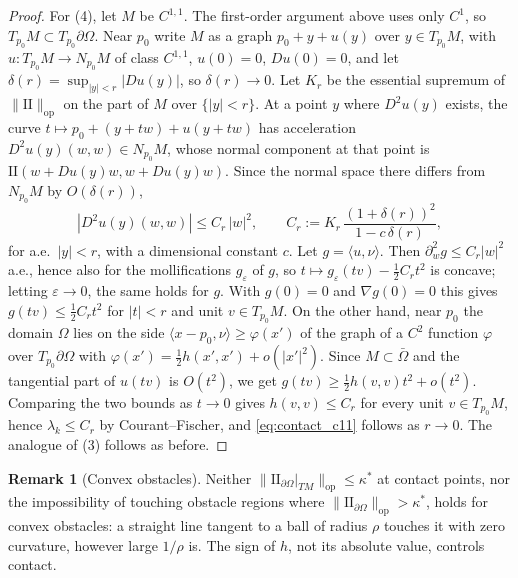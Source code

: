 \documentclass[11pt,reqno]{amsart}
\theoremstyle{definition}
\newtheorem{remark}[theorem]{Remark}
\providecommand{\II}{\mathrm{I\!I}}
\newcommand{\op}{\mathrm{op}}
\numberwithin{equation}{section}
\providecommand{\II}{\mathrm{II}}
\begin{document}
\begin{proof}
For (4), let $M$ be $C^{1,1}$. The first-order argument above uses only $C^1$, so $T_{p_0}M \subset T_{p_0}\partial\Omega$. Near $p_0$ write $M$ as a graph $p_0 + y + u(y)$ over $y \in T_{p_0}M$, with $u \colon T_{p_0}M \to N_{p_0}M$ of class $C^{1,1}$, $u(0) = 0$, $Du(0) = 0$, and let $\delta(r) = \sup_{|y| < r}|Du(y)|$, so $\delta(r) \to 0$. Let $K_r$ be the essential supremum of $\|\II\|_{\op}$ on the part of $M$ over $\{|y| < r\}$. At a point $y$ where $D^2u(y)$ exists, the curve $t \mapsto p_0 + (y + tw) + u(y + tw)$ has acceleration $D^2u(y)(w,w) \in N_{p_0}M$, whose normal component at that point is $\II(w + Du(y)w, w + Du(y)w)$. Since the normal space there differs from $N_{p_0}M$ by $O(\delta(r))$,
\begin{equation*}
|D^2u(y)(w,w)| \le C_r\,|w|^2, \qquad C_r := K_r\,\frac{(1+\delta(r))^2}{1 - c\,\delta(r)},
\end{equation*}
for a.e.\ $|y| < r$, with a dimensional constant $c$. Let $g = \langle u, \nu\rangle$. Then $\partial_w^2 g \le C_r|w|^2$ a.e., hence also for the mollifications $g_\varepsilon$ of $g$, so $t \mapsto g_\varepsilon(tv) - \tfrac12 C_r t^2$ is concave; letting $\varepsilon \to 0$, the same holds for $g$. With $g(0) = 0$ and $\nabla g(0) = 0$ this gives $g(tv) \le \tfrac12 C_r t^2$ for $|t| < r$ and unit $v \in T_{p_0}M$. On the other hand, near $p_0$ the domain $\Omega$ lies on the side $\langle x - p_0, \nu\rangle \ge \varphi(x')$ of the graph of a $C^2$ function $\varphi$ over $T_{p_0}\partial\Omega$ with $\varphi(x') = \tfrac12 h(x',x') + o(|x'|^2)$. Since $M \subset \bar\Omega$ and the tangential part of $u(tv)$ is $O(t^2)$, we get $g(tv) \ge \tfrac12 h(v,v)t^2 + o(t^2)$. Comparing the two bounds as $t \to 0$ gives $h(v,v) \le C_r$ for every unit $v \in T_{p_0}M$, hence $\lambda_k \le C_r$ by Courant--Fischer, and \eqref{eq:contact_c11} follows as $r \to 0$. The analogue of (3) follows as before.
\end{proof}

\begin{remark}[Convex obstacles]
Neither $\|\II_{\partial\Omega}|_{TM}\|_{\op} \le \kappa^*$ at contact points, nor the impossibility of touching obstacle regions where $\|\II_{\partial\Omega}\|_{\op} > \kappa^*$, holds for convex obstacles: a straight line tangent to a ball of radius $\rho$ touches it with zero curvature, however large $1/\rho$ is. The sign of $h$, not its absolute value, controls contact.
\end{remark}
\end{document}
